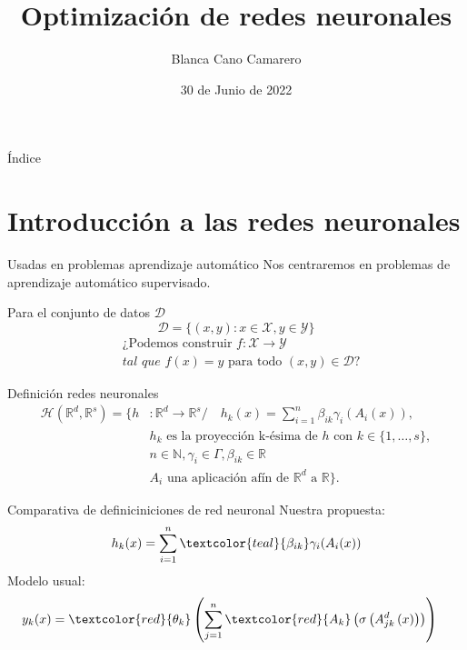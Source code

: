 \documentclass{beamer}
\title{Optimización de redes neuronales}
\author{Blanca Cano Camarero}
\date{30 de Junio de 2022}
\newcommand{\R}{\mathbb{R}}
\newcommand{\N}{\mathbb{N}}
\begin{document}
\begin{frame}
    \titlepage 
\end{frame}


\begin{frame}{Índice}
    \tableofcontents
\end{frame}
\section{Introducción a las redes neuronales}
\begin{frame}{Usadas en problemas aprendizaje automático}
    Nos centraremos en problemas de aprendizaje automático supervisado. 

    Para el conjunto de datos  $\mathcal{D}$
    \begin{equation*}
        \mathcal{D} = \{(x,y) : x \in \mathcal{X}, y \in \mathcal{Y}\}
    \end{equation*}
    \begin{align*}
        &\text{¿Podemos construir } f: \mathcal{X} \longrightarrow \mathcal{Y} \\
        &\textit{tal que } f(x) = y \text{ para todo } (x,y) \in \mathcal{D} \text{?}
    \end{align*} 
\end{frame}
\begin{frame}{Definición redes neuronales}
    \begin{align*}
        \mathcal{H}(\R^d,\R^s) 
            =
            \{
                h &: \R^d \longrightarrow \R^s 
                 /\quad 
                h_k(x) = 
                \sum_{i=1}^{n} \beta_{i k} \gamma_{i}( A_{i}(x)), \\
                & \text{$h_k$  es la proyección k-ésima de $h$ con 
                $k \in \{1, \ldots, s\}$}, \\
                & n \in \N,\gamma_{i} \in \Gamma , \beta_{i k} \in \R \\
                &A_{i} \text{ una aplicación afín de $\R^d$ a $\R$}           
            \}.
    \end{align*}
\end{frame}

\begin{frame}{Comparativa de definiciniciones de red neuronal}
    Nuestra propuesta: 
    \begin{align*}
                h_k(x) = 
                \sum_{i=1}^{n} \textcolor{teal}{\beta_{i k}} \gamma_{i}( A_{i}(x))
    \end{align*}
    Modelo usual:
    \begin{align*}
        y_k(x) &= 
        \textcolor{red}{\theta_k}
        \left( 
            \sum^n_{j=1} \textcolor{red}{A_{k}}
            \left(
                \sigma 
                \left(
                    A^{d}_{j k}
                    \left(
                        x
                    \right)
                \right)
            \right)
        \right)
    \end{align*}
\end{frame}
\end{document}

